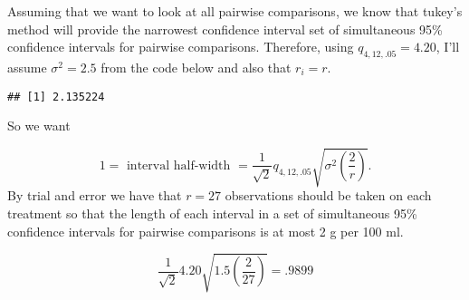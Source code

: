 \documentclass[12pt,]{article}
\newenvironment{Shaded}{\begin{snugshade}}{\end{snugshade}}
\newcommand{\KeywordTok}[1]{\textcolor[rgb]{0.13,0.29,0.53}{\textbf{#1}}}
\newcommand{\DecValTok}[1]{\textcolor[rgb]{0.00,0.00,0.81}{#1}}
\newcommand{\OperatorTok}[1]{\textcolor[rgb]{0.81,0.36,0.00}{\textbf{#1}}}
\newcommand{\NormalTok}[1]{#1}
\begin{document}
Assuming that we want to look at all pairwise comparisons, we know that
tukey's method will provide the narrowest confidence interval set of
simultaneous 95\% confidence intervals for pairwise comparisons.
Therefore, using \(q_{4,12,.05} = 4.20\), I'll assume \(\sigma^2 = 2.5\)
from the code below and also that \(r_i = r\).

\begin{Shaded}
\end{Shaded}

\begin{verbatim}
## [1] 2.135224
\end{verbatim}

So we want

\[
1 = \text{ interval half-width }= \frac{1}{\sqrt{2}} q_{4,12,.05} \sqrt{\sigma^2 \left( \frac{2}{r}\right)}.
\] By trial and error we have that \(r= 27\) observations should be
taken on each treatment so that the length of each interval in a set of
simultaneous 95\% confidence intervals for pairwise comparisons is at
most 2 g per 100 ml.

\[ \frac{1}{\sqrt{2}} 4.20  \sqrt{1.5 \left( \frac{2}{27}\right)} = .9899\]
\end{document}
